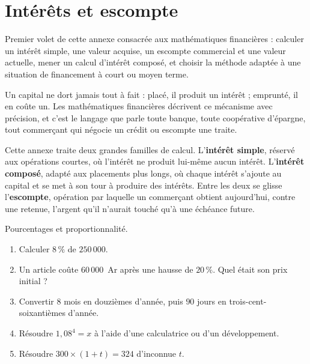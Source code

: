 \chapter{Intérêts et escompte}

Premier volet de cette annexe consacrée aux mathématiques financières :
calculer un intérêt simple, une valeur acquise, un escompte commercial et
une valeur actuelle, mener un calcul d'intérêt composé, et choisir la
méthode adaptée à une situation de financement à court ou moyen terme.

Un capital ne dort jamais tout à fait : placé, il produit un intérêt ;
emprunté, il en coûte un. Les mathématiques financières décrivent ce
mécanisme avec précision, et c'est le langage que parle toute banque, toute
coopérative d'épargne, tout commerçant qui négocie un crédit ou escompte une
traite.

Cette annexe traite deux grandes familles de calcul. L'\textbf{intérêt
simple}, réservé aux opérations courtes, où l'intérêt ne produit lui-même
aucun intérêt. L'\textbf{intérêt composé}, adapté aux placements plus longs,
où chaque intérêt s'ajoute au capital et se met à son tour à produire des
intérêts. Entre les deux se glisse l'\textbf{escompte}, opération par
laquelle un commerçant obtient aujourd'hui, contre une retenue, l'argent
qu'il n'aurait touché qu'à une échéance future.

\begin{revision}
Pourcentages et proportionnalité.

\begin{enumerate}[label=\textbf{\arabic*.}, leftmargin=*, itemsep=0.35em]
  \item Calculer $8\,\%$ de $250\,000$.
  \item Un article coûte $60\,000$~Ar après une hausse de $20\,\%$. Quel
        était son prix initial ?
  \item Convertir $8$ mois en douzièmes d'année, puis $90$ jours en
        trois-cent-soixantièmes d'année.
  \item Résoudre $1{,}08^{4} = x$ à l'aide d'une calculatrice ou d'un
        développement.
  \item Résoudre $300 \times (1+t) = 324$ d'inconnue $t$.
\end{enumerate}
\end{revision}

